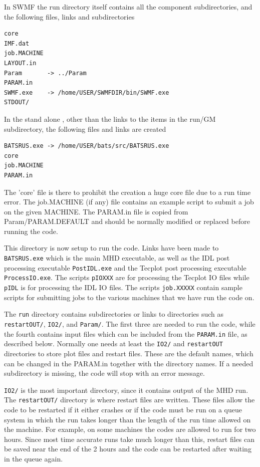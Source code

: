 In SWMF the run directory itself contains all the component 
subdirectories, and the following files, links and subdirectories
\begin{verbatim}
core
IMF.dat
job.MACHINE
LAYOUT.in
Param       -> ../Param
PARAM.in
SWMF.exe    -> /home/USER/SWMFDIR/bin/SWMF.exe
STDOUT/
\end{verbatim}
In the stand alone \BATSRUS, other than the links to the
items in the run/GM subdirectory, the following files and links
are created
\begin{verbatim}
BATSRUS.exe -> /home/USER/bats/src/BATSRUS.exe
core
job.MACHINE
PARAM.in
\end{verbatim} 
The 'core' file is there to prohibit the creation a huge
core file due to a run time error. The job.MACHINE (if any)
file contains an example script to submit a job on the
given MACHINE. The PARAM.in file
is copied from Param/PARAM.DEFAULT and should be
normally modified or replaced before running the code.

This directory is now setup to run the code.  Links have been made to 
{\tt BATSRUS.exe} which is the main MHD executable, as well as the 
IDL post processing executable {\tt PostIDL.exe} and the Tecplot post 
processing executable {\tt ProcessIO.exe}.  The scripts {\tt pIOXXX}
are for processing the Tecplot IO files while {\tt pIDL} is for
processing the IDL IO files.  The scripts {\tt job.XXXXX} contain
sample scripts for submitting jobs to the various machines that we
have run the code on.  

The {\tt run} directory contains subdirectories or links to directories
such as {\tt restartOUT/}, {\tt IO2/}, and {\tt Param/}.  
The first three are needed to run the code, 
while the fourth contains input files which can be
included from the {\tt PARAM.in} file, as described below.
Normally one needs at least the {\tt IO2/} and {\tt restartOUT}
directories to store plot files and restart files.
These are the default names, which can be changed in the PARAM.in
together with the directory names.
If a needed subdirectory is missing, the code will stop with an error
message.

{\tt IO2/} is the most important directory, since it contains output
of the MHD run.  The {\tt restartOUT/} directory is where restart
files are written.  These files allow the code to be restarted if it
either crashes or if the code must be run on a queue system in which
the run takes longer than the length of the run time allowed on the
machine.  For example, on some machines the codes are allowed to run for
two hours.  Since most time accurate runs take much longer than
this, restart files can be saved near the end of the 2 hours
and the code can be restarted after waiting in the queue again.

